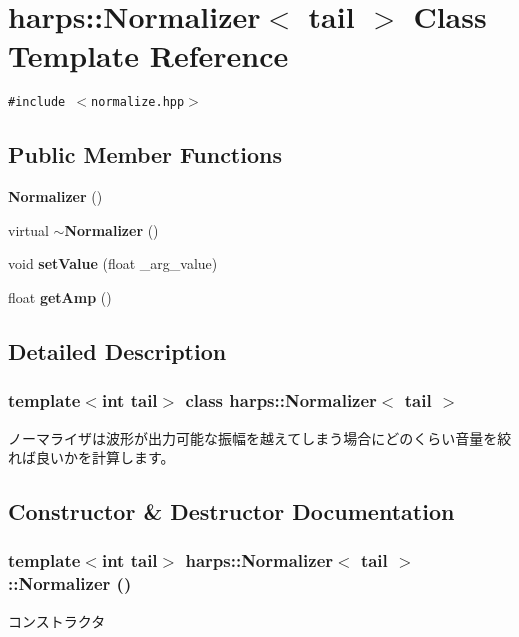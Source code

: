 \section{harps::Normalizer$<$ tail $>$ Class Template Reference}
\label{classharps_1_1Normalizer}
{\tt \#include $<$normalize.hpp$>$}

\subsection*{Public Member Functions}
\begin{CompactItemize}
\item 
{\bf Normalizer} ()
\item 
virtual {\bf $\sim$Normalizer} ()
\item 
void {\bf setValue} (float \_\-arg\_\-value)
\item 
float {\bf getAmp} ()
\end{CompactItemize}


\subsection{Detailed Description}
\subsubsection*{template$<$int tail$>$ class harps::Normalizer$<$ tail $>$}

ノーマライザは波形が出力可能な振幅を越えてしまう場合にどのくらい音量を絞れば良いかを計算します。 

\subsection{Constructor \& Destructor Documentation}
\subsubsection[Normalizer]{\setlength{\rightskip}{0pt plus 5cm}template$<$int tail$>$ {\bf harps::Normalizer}$<$ tail $>$::{\bf Normalizer} ()\hspace{0.3cm}{\tt  [inline]}}\label{classharps_1_1Normalizer_fa7525284211f02baf449163696400b2}


コンストラクタ 
